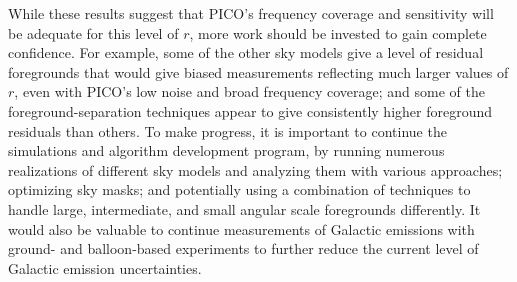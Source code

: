 \documentclass[PICOReport.tex]{subfiles}
\begin{document}
While these results suggest that PICO's frequency coverage and sensitivity will be adequate for this level of $r$,  more work should be invested to gain complete confidence. For example, some of the other sky models give a level of residual foregrounds that would give biased measurements reflecting much larger values of $r$, even with PICO's low noise and broad frequency coverage; and some of the foreground-separation techniques appear to give consistently higher foreground residuals than others. To make progress, it is important to continue the simulations and algorithm development program, by  running numerous realizations of different sky models and analyzing them with various approaches; optimizing sky masks; and potentially using a combination of techniques to handle large, intermediate, and small angular scale foregrounds differently. It would also be valuable to continue measurements of Galactic emissions with ground- and balloon-based experiments to further reduce the current level of Galactic emission uncertainties. 
\end{document}

